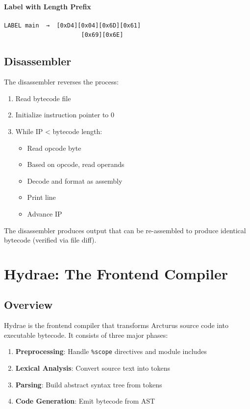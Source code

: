 \documentclass[11pt,a4paper]{article}
\begin{document}
\paragraph{Label with Length Prefix}
\begin{verbatim}
LABEL main  →  [0xD4][0x04][0x6D][0x61]
                      [0x69][0x6E]
\end{verbatim}

\subsection{Disassembler}

The disassembler reverses the process:

\begin{enumerate}
    \item Read bytecode file
    \item Initialize instruction pointer to 0
    \item While IP < bytecode length:
    \begin{itemize}
        \item Read opcode byte
        \item Based on opcode, read operands
        \item Decode and format as assembly
        \item Print line
        \item Advance IP
    \end{itemize}
\end{enumerate}

The disassembler produces output that can be re-assembled to produce identical bytecode (verified via file diff).

\newpage
\section{Hydrae: The Frontend Compiler}

\subsection{Overview}

Hydrae is the frontend compiler that transforms Arcturus source code into executable bytecode. It consists of three major phases:

\begin{enumerate}
    \item \textbf{Preprocessing}: Handle \texttt{\%scope} directives and module includes
    \item \textbf{Lexical Analysis}: Convert source text into tokens
    \item \textbf{Parsing}: Build abstract syntax tree from tokens
    \item \textbf{Code Generation}: Emit bytecode from AST
\end{enumerate}
\end{document}
